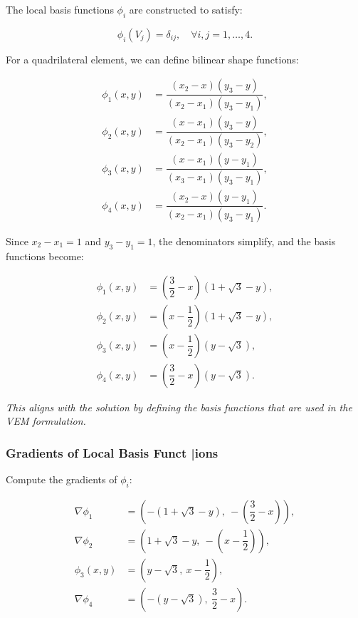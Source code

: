 \documentclass[class=article, crop=false]{standalone}
\begin{document}
The local basis functions $\phi_i$ are constructed to satisfy:

\[
\phi_i(V_j) = \delta_{ij}, \quad \forall i, j = 1, \dots, 4.
\]

For a quadrilateral element, we can define bilinear shape functions:

\begin{align*}
\phi_1(x, y) &= \dfrac{(x_2 - x)(y_3 - y)}{(x_2 - x_1)(y_3 - y_1)}, \\
\phi_2(x, y) &= \dfrac{(x - x_1)(y_3 - y)}{(x_2 - x_1)(y_3 - y_2)}, \\
\phi_3(x, y) &= \dfrac{(x - x_1)(y - y_1)}{(x_3 - x_1)(y_3 - y_1)}, \\
\phi_4(x, y) &= \dfrac{(x_2 - x)(y - y_1)}{(x_2 - x_1)(y_3 - y_1)}.
\end{align*}

Since $x_2 - x_1 = 1$ and $y_3 - y_1 = 1$, the denominators simplify, and the basis functions become:

\begin{align*}
\phi_1(x, y) &= \left( \dfrac{3}{2} - x \right) \left( 1 + \sqrt{3} - y \right), \\
\phi_2(x, y) &= \left( x - \dfrac{1}{2} \right) \left( 1 + \sqrt{3} - y \right), \\
\phi_3(x, y) &= \left( x - \dfrac{1}{2} \right) \left( y - \sqrt{3} \right), \\
\phi_4(x, y) &= \left( \dfrac{3}{2} - x \right) \left( y - \sqrt{3} \right).
\end{align*}

\noindent
\textit{This aligns with the solution by defining the basis functions that are used in the VEM formulation.}

\subsubsection{Gradients of Local Basis Funct
|ions}

Compute the gradients of $\phi_i$:

\begin{align*}
\nabla \phi_1 &= \left( - (1 + \sqrt{3} - y),\ - \left( \dfrac{3}{2} - x \right) \right), \\
\nabla \phi_2 &= \left( 1 + \sqrt{3} - y,\ - \left( x - \dfrac{1}{2} \right) \right), \\
\phi_3(x, y) &= \left( y - \sqrt{3},\ x - \dfrac{1}{2} \right), \\
\nabla \phi_4 &= \left( - (y - \sqrt{3}),\ \dfrac{3}{2} - x \right).
\end{align*}
\end{document}

